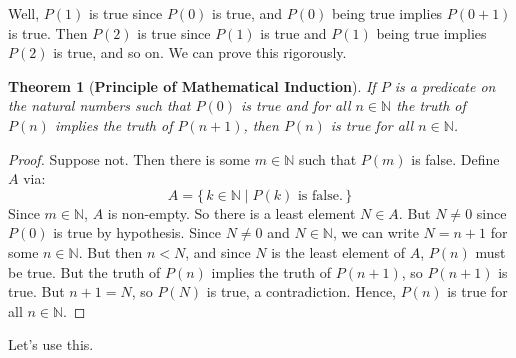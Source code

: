 \documentclass{article}
\theoremstyle{plain}
\newtheorem{theorem}{Theorem}
\theoremstyle{normal}
\begin{document}
    Well, $P(1)$ is true since $P(0)$ is true, and $P(0)$ being true implies
    $P(0+1)$ is true. Then $P(2)$ is true since $P(1)$ is true and $P(1)$ being
    true implies $P(2)$ is true, and so on. We can prove this rigorously.
    \begin{theorem}[\textbf{Principle of Mathematical Induction}]
        If $P$ is a predicate on the natural numbers such that $P(0)$ is true
        and for all $n\in\mathbb{N}$ the truth of $P(n)$ implies the truth of
        $P(n+1)$, then $P(n)$ is true for all $n\in\mathbb{N}$.
    \end{theorem}
    \begin{proof}
        Suppose not. Then there is some $m\in\mathbb{N}$ such that
        $P(m)$ is false. Define $A$ via:
        \begin{equation}
            A=\{\,k\in\mathbb{N}\;|\;P(k)\textrm{ is false.}\,\}
        \end{equation}
        Since $m\in\mathbb{N}$, $A$ is non-empty. So there is a least element
        $N\in{A}$. But $N\ne{0}$ since $P(0)$ is true by hypothesis. Since
        $N\ne{0}$ and $N\in\mathbb{N}$, we can write $N=n+1$ for some
        $n\in\mathbb{N}$. But then $n<N$, and since $N$ is the least element
        of $A$, $P(n)$ must be true. But the truth of $P(n)$ implies the
        truth of $P(n+1)$, so $P(n+1)$ is true. But $n+1=N$, so $P(N)$ is true,
        a contradiction. Hence, $P(n)$ is true for all $n\in\mathbb{N}$.
    \end{proof}
    Let's use this.
\end{document}
